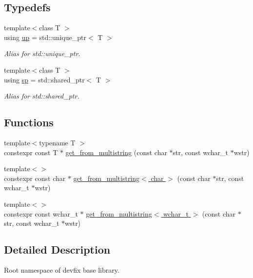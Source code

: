 \subsection*{Typedefs}
\begin{DoxyCompactItemize}
\item 
{\footnotesize template$<$class T $>$ }\\using \hyperlink{namespacedevfix_1_1base_a18dfbd492717795cee1cfa6f14a8f724}{up} = std\+::unique\+\_\+ptr$<$ T $>$
\begin{DoxyCompactList}\small\item\em Alias for std\+::unique\+\_\+ptr. \end{DoxyCompactList}\item 
{\footnotesize template$<$class T $>$ }\\using \hyperlink{namespacedevfix_1_1base_ad239a07977b9e77ffabaf558636d0b8b}{sp} = std\+::shared\+\_\+ptr$<$ T $>$
\begin{DoxyCompactList}\small\item\em Alias for std\+::shared\+\_\+ptr. \end{DoxyCompactList}\end{DoxyCompactItemize}
\subsection*{Functions}
\begin{DoxyCompactItemize}
\item 
{\footnotesize template$<$typename T $>$ }\\constexpr const T $\ast$ \hyperlink{namespacedevfix_1_1base_a84282bc5458412dfed5ce8b039a70519}{get\+\_\+from\+\_\+multistring} (const char $\ast$str, const wchar\+\_\+t $\ast$wstr)
\item 
{\footnotesize template$<$$>$ }\\constexpr const char $\ast$ \hyperlink{namespacedevfix_1_1base_a1d6f6a1a767fa54cd6ff94ae14b43e90}{get\+\_\+from\+\_\+multistring$<$ char $>$} (const char $\ast$str, const wchar\+\_\+t $\ast$wstr)
\item 
{\footnotesize template$<$$>$ }\\constexpr const wchar\+\_\+t $\ast$ \hyperlink{namespacedevfix_1_1base_a100ea64654a747f262206d9e4b31e6f2}{get\+\_\+from\+\_\+multistring$<$ wchar\+\_\+t $>$} (const char $\ast$str, const wchar\+\_\+t $\ast$wstr)
\end{DoxyCompactItemize}


\subsection{Detailed Description}
Root namespace of devfix base library. 

